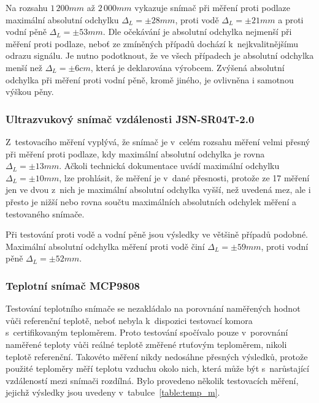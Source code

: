             Na rozsahu $1\,200\unit{mm}$ až $2\,000\unit{mm}$ vykazuje snímač při měření proti podlaze maximální absolutní odchylku $\Delta_L = \pm28\unit{mm}$, proti vodě $\Delta_L = \pm21\unit{mm}$ a proti vodní pěně $\Delta_L = \pm53\unit{mm}$. Dle očekávání je absolutní odchylka nejmenší při měření proti podlaze, neboť ze zmíněných případů dochází k~nejkvalitnějšímu odrazu signálu. Je nutno podotknout, že ve všech případech je absolutní odchylka menší než $\Delta_L = \pm6\unit{cm}$, která je deklarována výrobcem. Zvýšená absolutní odchylka při měření proti vodní pěně, kromě jiného, je ovlivněna i samotnou výškou pěny. 

        \subsubsection{Ultrazvukový snímač vzdálenosti JSN-SR04T-2.0}
            Z~testovacího měření  vyplývá, že snímač je v~celém rozsahu měření velmi přesný při měření proti podlaze, kdy maximální absolutní odchylka je rovna $\Delta_L = \pm13\unit{mm}$. Ačkoli technická dokumentace uvádí maximální odchylku $\Delta_L = \pm10\unit{mm}$, lze prohlásit, že měření je v~dané přesnosti, protože ze 17 měření jen ve dvou z~nich je maximální absolutní odchylka vyšší, než uvedená mez, ale i přesto je nižší nebo rovna součtu maximálních absolutních odchylek měření a testovaného snímače.

            Při testování proti vodě a vodní pěně jsou výsledky ve většině případů podobné. Maximální absolutní odchylka měření proti vodě činí $\Delta_L = \pm59\unit{mm}$, proti vodní pěně $\Delta_L = \pm52\unit{mm}$. 

        \subsubsection{Teplotní snímač MCP9808}
            Testování teplotního snímače  se nezakládalo na porovnání naměřených hodnot vůči referenční teplotě, neboť nebyla k~dispozici testovací komora s~certifikovaným teploměrem. Proto testování spočívalo pouze v~porovnání naměřené teploty vůči reálné teplotě změřené rtuťovým teploměrem, nikoli teplotě referenční. Takovéto měření nikdy nedosáhne přesných výsledků, protože použité teploměry měří teplotu vzduchu okolo nich, která může být s~narůstající vzdáleností mezi snímači rozdílná.
            Bylo provedeno několik testovacích měření, jejichž výsledky jsou uvedeny v~tabulce~\ref{table:temp_m}.
            
